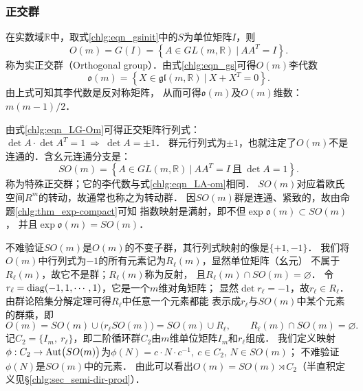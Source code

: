 

\subsubsection{正交群}\label{chlg:sec_Orthogonal}
在实数域$\mathbb{R}$中，取式\eqref{chlg:eqn_gsinit}中的$S$为单位矩阵$I$，则
\begin{equation}\label{chlg:eqn_LG-Om}
    O(m) = G(I)= \left\{ A \in GL(m,\mathbb{R})\ |\ A A^T =I \right\}.
\end{equation}
称为实{\heiti 正交群}（Orthogonal group）．由式\eqref{chlg:eqn_gs}可得$O(m)$李代数
\begin{equation}\label{chlg:eqn_LA-om}
    \mathfrak{o}(m) = \left\{ X \in \mathfrak{gl}(m,\mathbb{R}) \ | \ 
    X  +  X^T = 0 \right\} .
\end{equation}
由上式可知其李代数是反对称矩阵，
从而可得$\mathfrak{o}(m)$及$O(m)$维数：$m(m-1)/2$．

由式\eqref{chlg:eqn_LG-Om}可得正交矩阵行列式：
$\det A \cdot \det A^T = 1 \ \Rightarrow \ \det A = \pm 1$．
群元行列式为$\pm 1$，也就注定了$O(m)$不是连通的．含幺元连通分支是：
\begin{equation}\label{chlg:eqn_LG-so}
    SO(m) %
    = \left\{ A \in GL(m,\mathbb{R})\ |\ A A^T =I 
    \ \text{且}\ \det A = 1 \right\} .
\end{equation}
称为{\heiti 特殊正交群}；它的李代数与式\eqref{chlg:eqn_LA-om}相同．
$SO(m)$对应着欧氏空间$R^m$的转动，故通常也称之为{\heiti 转动群}．
因$SO(m)$群是连通、紧致的，故由命题\ref{chlg:thm_exp-compact}可知
指数映射是满射，即不但$\exp \mathfrak{o}(m) \subset SO(m)$，
并且$\exp \mathfrak{o}(m) = SO(m)$．






不难验证$SO(m)$是$O(m)$的不变子群，其行列式映射的像是$\{+1,-1\}$．
我们将$O(m)$中行列式为$-1$的所有元素记为$R_{\ell}(m)$，显然单位矩阵（幺元）
不属于$R_{\ell}(m)$，故它不是群；$R_{\ell}(m)$称为{\heiti 反射}，
且$R_{\ell}(m)\cap SO(m)=\varnothing$．
令$r_{\ell}={\rm diag}(-1,1,\cdots,1)$，它是一个$m$维对角矩阵；
显然$\det r_{\ell} = -1$，故$r_{\ell}\in R_{\ell}$．
由群论陪集分解定理可得$R_{\ell}$中任意一个元素都能
表示成$r_{\ell}$与$SO(m)$中某个元素的群乘，即
\begin{equation*}
    O(m)= SO(m)\cup \bigl(r_{\ell}SO(m)\bigr)= SO(m) \cup R_{\ell},
    \qquad R_{\ell}(m)\cap SO(m)=\varnothing . 
\end{equation*}
记$C_2=\{I_m,\ r_{\ell}\}$，即二阶循环群$C_2$由$m$维单位矩阵$I_m$和$r_{\ell}$组成．
我们定义映射$\phi:C_2 \to {\rm Aut}\bigl(SO(m)\bigr)$为$\phi(N)=c\cdot N \cdot c^{-1},
\  c\in C_2, \, N\in SO(m)$；
不难验证$\phi(N)$是$SO(m)$中的元素．
由此可以看出$O(m)=SO(m)\rtimes C_2$（半直积定义见\S\ref{chlg:sec_semi-dir-prod}）．



